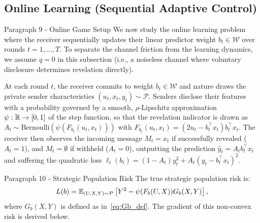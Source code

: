 \subsection{Online Learning (Sequential Adaptive Control)}
\label{sec:regression_online}

\begin{sourceblock}{Paragraph 9 - Online Game Setup}
We now study the online learning problem where the receiver sequentially updates their linear predictor weight $b_t \in \mathcal{W}$ over rounds $t = 1, \dots, T$. To separate the channel friction from the learning dynamics, we assume $q = 0$ in this subsection (i.e., a noiseless channel where voluntary disclosure determines revelation directly).

At each round $t$, the receiver commits to weight $b_t \in \mathcal{W}$ and nature draws the private sender characteristics $(u_t, x_t, y_t) \sim \mathcal{P}$. Senders disclose their features with a probability governed by a smooth, $\rho$-Lipschitz approximation $\psi: \mathbb{R} \to [0, 1]$ of the step function, so that the revelation indicator is drawn as $A_t \sim \mathrm{Bernoulli}(\psi(F_{b_t}(u_t, x_t)))$ with $F_{b_t}(u_t, x_t) = (2u_t - b_t^\top x_t)b_t^\top x_t$. The receiver then observes the incoming message $M_t = x_t$ if successfully revealed ($A_t = 1$), and $M_t = \emptyset$ if withheld ($A_t = 0$), outputting the prediction $\hat{y}_t = A_t b_t^\top x_t$ and suffering the quadratic loss $\ell_t(b_t) = (1 - A_t)y_t^2 + A_t(y_t - b_t^\top x_t)^2$.
\end{sourceblock}

\begin{faqblock}
\faqanswers
{}
\end{faqblock}

\begin{sourceblock}{Paragraph 10 - Strategic Population Risk}
The true strategic population risk is:
\begin{equation}
    \label{eq:pop_risk_online}
    L(b) = \mathbb{E}_{(U,X,Y) \sim \mathcal{P}}\left[ Y^2 - \psi(F_b(U, X)) G_b(X, Y) \right],
\end{equation}
where $G_b(X, Y)$ is defined as in~\eqref{eq:Gb_def}. The gradient of this non-convex risk is derived below.
\end{sourceblock}

